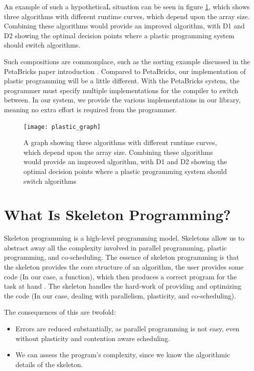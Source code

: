 An example of such a hypotheticaL situation can be seen in figure \ref{fig:plastic_graph}, which shows three algorithms with different runtime curves, which depend upon the array size. Combining these algorithms would provide an improved algorithm, with D1 and D2 showing the optimal decision points where a plastic programming system should switch algorithms.

Such compositions are commonplace, such as the sorting example discussed in the PetaBricks paper introduction \cite{petabricks}. Compared to PetaBricks, our implementation of plastic programming will be a little different. With the PetaBricks system, the programmer must specify multiple implementations for the compiler to switch between. In our system, we provide the various implementations in our library, meaning no extra effort is required from the programmer.



\begin{figure}
	\centering
	\texttt{[image: plastic\_graph]}
	\caption{A graph showing three algorithms with different runtime curves, which depend upon the array size. Combining these algorithms would provide an improved algorithm, with D1 and D2 showing the optimal decision points where a plastic programming system should switch algorithms}
	\label{fig:plastic_graph}
\end{figure}



\section{What Is Skeleton Programming?}
\label{section:background_what_is_skeleton_programming}

Skeleton programming is a high-level programming model. Skeletons allow us to abstract away all the complexity involved in parallel programming, plastic programming, and co-scheduling. The essence of skeleton programming is that the skeleton provides the core structure of an algorithm, the user provides some code (In our case, a function), which then produces a correct program for the task at hand \cite{patterns_and_frameworks}. The skeleton handles the hard-work of providing and optimizing the code (In our case, dealing with parallelism, plasticity, and co-scheduling). 

The consequences of this are twofold:

\begin{itemize}
	\item Errors are reduced substantially, as parallel programming is not easy, even without plasticity and contention aware scheduling.
	\item We can assess the program's complexity, since we know the algorithmic details of the skeleton.
\end{itemize}

